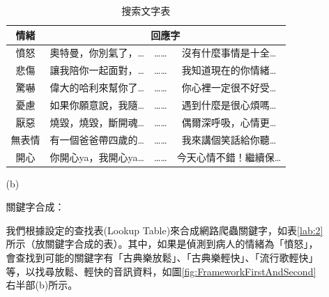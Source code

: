 \documentclass[12pt]{scrreprt}
\begin{document}
\begin{itemize}
\begin{itemize}
\begin{table}[h]
\caption{搜索文字表}
    \centering
\begin{tabular}{|*{4}{r|}}
\hline
\multicolumn{1}{|c|}{情緒}
& \multicolumn{3}{c|}{回應字} \\\hline
\multicolumn{1}{|c}{憤怒}&\multicolumn{1}{|c}{奧特曼，你別氣了，…}&\multicolumn{1}{|c}{……}&\multicolumn{1}{|c|}{沒有什麼事情是十全…} \\\hline
\multicolumn{1}{|c}{悲傷}&\multicolumn{1}{|c}{讓我陪你一起面對，…}&\multicolumn{1}{|c}{……}&\multicolumn{1}{|c|}{我知道現在的你情緒…} \\\hline
\multicolumn{1}{|c}{驚嚇}&\multicolumn{1}{|c}{偉大的哈利來幫你了…}&\multicolumn{1}{|c}{……}&\multicolumn{1}{|c|}{你心裡一定很不好受…}\\\hline
\multicolumn{1}{|c}{憂慮}&\multicolumn{1}{|c}{如果你願意說，我隨…}&\multicolumn{1}{|c}{……}&\multicolumn{1}{|c|}{遇到什麼是很心煩嗎…}\\\hline
\multicolumn{1}{|c}{厭惡}&\multicolumn{1}{|c}{燒毀，燒毀，斷開魂…}   &\multicolumn{1}{|c}{……}   &\multicolumn{1}{|c|}{偶爾深呼吸，心情更… }\\\hline
\multicolumn{1}{|c}{無表情}&\multicolumn{1}{|c}{有一個爸爸帶四歲的…}   &\multicolumn{1}{|c}{……}   &\multicolumn{1}{|c|}{我來講個笑話給你聽…}\\\hline
\multicolumn{1}{|c}{開心}&\multicolumn{1}{|c}{你開心ya，我開心ya…}   &\multicolumn{1}{|c}{……}   &\multicolumn{1}{|c|}{今天心情不錯！繼續保…}\\\hline
\end{tabular}
\label{lab:searchtext}
\end{table}

\item[(b)]{\begin{bfseries}{關鍵字合成：}\end{bfseries}}

我們根據設定的查找表(Lookup Table)來合成網路爬蟲關鍵字，如表\ref{lab:2}所示（放關鍵字合成的表）。其中，如果是偵測到病人的情緒為「憤怒」，會查找到可能的關鍵字有「古典樂放鬆」、「古典樂輕快」、「流行歌輕快」等，以找尋放鬆、輕快的音訊資料，如圖\ref{fig:FrameworkFirstAndSecond}右半部(b)所示。


\end{itemize}
\end{itemize}
\end{document}
